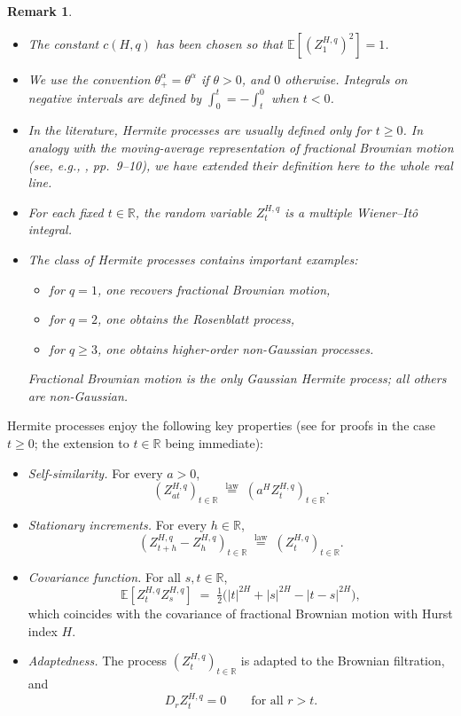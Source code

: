 \documentclass[a4paper,10pt]{article}
\theoremstyle{definition}
\theoremstyle{plain}
\newtheorem{rem}[Def]{Remark}
\newcommand{\R}{\mathbb{R}}
\newcommand{\E}{\mathbb{E}}
\newcommand\1{\mathbbm{1}}
\begin{document}
\begin{rem}
{\rm
\begin{itemize}
  \item The constant $c(H,q)$ has been chosen so that $\E[(Z_1^{H,q})^2]=1$.
  \item We use the convention $\theta^\alpha_+ = \theta^\alpha$ if $\theta>0$, and $0$ otherwise.  
        Integrals on negative intervals are defined by $\int_0^t  = -\int_t^0 $ when $t<0$.
  \item In the literature, Hermite processes are usually defined only for $t\ge0$.  
        In analogy with the moving-average representation of fractional Brownian motion (see, e.g., \cite{hult2003topics}, pp.~9--10), we have extended their definition here to the whole real line.
        \item For each fixed $t\in\R$, the random variable $Z_t^{H,q}$ is a multiple Wiener--Itô integral.  
\item The class of Hermite processes contains important examples:
\begin{itemize}
  \item for $q=1$, one recovers fractional Brownian motion, 
  \item for $q=2$, one obtains the Rosenblatt process,
  \item for $q\ge3$, one obtains higher-order non-Gaussian processes.
\end{itemize}
Fractional Brownian motion is the only Gaussian Hermite process; all others are non-Gaussian.
\end{itemize}
}
\end{rem}


\medskip
Hermite processes enjoy the following key properties (see \cite{Tudor23} for proofs in the case $t\ge0$; the extension to $t\in\R$ being immediate):

\begin{itemize}
  \item \textit{Self-similarity.} For every $a>0$,
  \[
  (Z_{at}^{H,q})_{t\in\R} \;\stackrel{\text{law}}{=}\; (a^H Z_t^{H,q})_{t\in\R}.
  \]
  \item \textit{Stationary increments.} For every $h\in\R$,
  \[
  (Z_{t+h}^{H,q}-Z_h^{H,q})_{t\in\R} \;\stackrel{\text{law}}{=}\; (Z_t^{H,q})_{t\in\R}.
  \]
  \item \textit{Covariance function.} For all $s,t\in\R$,
  \[
  \E[Z_t^{H,q}Z_s^{H,q}] \;=\; \tfrac12\big(|t|^{2H}+|s|^{2H}-|t-s|^{2H}\big),
  \]
  which coincides with the covariance of fractional Brownian motion with Hurst index $H$.
  \item \textit{Adaptedness.} The process $(Z_t^{H,q})_{t\in\R}$ is adapted to the Brownian filtration, and
  \begin{equation}\label{eq:adapt}
  D_r Z_t^{H,q} = 0 \qquad \text{for all } r>t.
  \end{equation}
\end{itemize}
\end{document}

